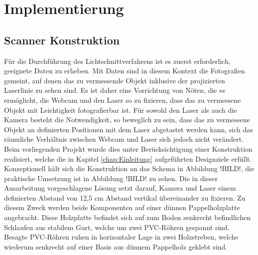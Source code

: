 \chapter{Implementierung}
\label{chap:Implementierung}

\section{Scanner Konstruktion}
\label{sec:scannerKonstruktion}
Für die Durchführung des Lichtschnittverfahrens ist es zuerst erforderlich, geeignete Daten zu erheben. Mit Daten sind in diesem Kontext die Fotografien gemeint, auf denen das zu vermessende Objekt inklusive der projizierten Laserlinie zu sehen sind. Es ist daher eine Vorrichtung von Nöten, die es ermöglicht, die Webcam und den Laser so zu fixieren, dass das zu vermessene Objekt mit Leichtigkeit fotografierbar ist. Für sowohl den Laser als auch die Kamera besteht die Notwendigkeit, so beweglich zu sein, dass das zu vermessene Objekt an definierten Positionen mit dem Laser abgetastet werden kann, sich das räumliche Verhältnis zwischen Webcam und Laser sich jedoch nicht verändert. Beim vorliegenden Projekt wurde dies unter Berücksichtigung einer Konstruktion realisiert, welche die in Kapitel \ref{chap:Einleitung} aufgeführten Designziele erfüllt. Konzeptionell hält sich die Konstruktion an das Schema in Abbildung !BILD!, die praktische Umsetzung ist in Abbildung !BILD! zu sehen. Die in dieser Ausarbeitung vorgeschlagene Lösung setzt darauf, Kamera und Laser einem definierten Abstand von 12,5 cm Abstand vertikal übereinander zu fixieren. Zu diesem Zweck werden beide Komponenten auf einer dünnen Pappelholzplatte angebracht. Diese Holzplatte befindet sich auf zum Boden senkrecht befindlichen Schlaufen aus stabilem Gurt, welche um zwei PVC-Röhren gespannt sind. Besagte PVC-Röhren ruhen in horizontaler Lage in zwei Holzstreben, welche wiederum senkrecht auf einer Basis aus dünnem Pappelholz geklebt sind. 

